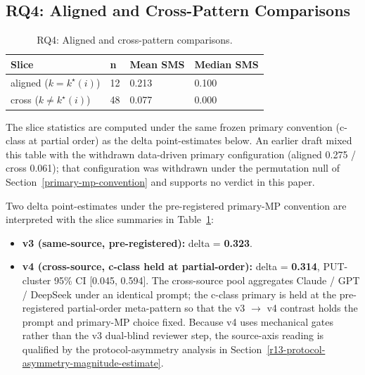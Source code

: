 \documentclass[manuscript,screen,review]{acmart}
\begin{document}
\subsection{RQ4: Aligned and Cross-Pattern Comparisons}\label{rq2-aligned-vs-cross-cliffs-delta}

{%
\begin{longtable}[]{@{}llll@{}}
\caption{RQ4: Aligned and cross-pattern comparisons.}\label{tab:p2-09}\\
\toprule\noalign{}
Slice & n & Mean SMS & Median SMS \\
\midrule\noalign{}
\endhead
\bottomrule\noalign{}
\endlastfoot
aligned ($k = k^\star(i)$) & 12 & 0.213 & 0.100 \\
cross ($k \neq k^\star(i)$) & 48 & 0.077 & 0.000 \\
\end{longtable}
}

The slice statistics are computed under the same frozen primary
convention (c-class at partial order) as the delta point-estimates
below. An earlier draft mixed this table with the withdrawn data-driven
primary configuration (aligned 0.275 / cross 0.061); that configuration
was withdrawn under the permutation null of
Section~\ref{primary-mp-convention} and supports no verdict in this
paper.

Two delta point-estimates under the pre-registered primary-MP
convention are interpreted with the slice summaries in
Table~\ref{tab:p2-09}:

\begin{itemize}

\item
  \textbf{v3 (same-source, pre-registered):} delta = \textbf{0.323}.
\item
  \textbf{v4 (cross-source, c-class held at partial-order):} delta =
  \textbf{0.314}, PUT-cluster 95\% CI [0.045, 0.594]. The cross-source pool
  aggregates Claude / GPT / DeepSeek under an identical prompt; the
  c-class primary is held at the pre-registered partial-order
  meta-pattern so that the v3 $\to$ v4
  contrast holds the prompt and primary-MP choice fixed. Because v4 uses
  mechanical gates rather than the v3 dual-blind reviewer step, the
  source-axis reading is qualified by the protocol-asymmetry analysis in
  Section~\ref{r13-protocol-asymmetry-magnitude-estimate}.
\end{itemize}
\end{document}
